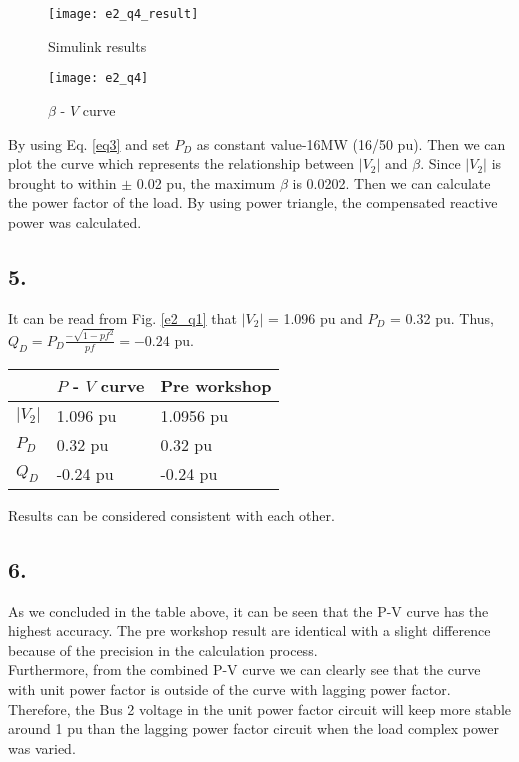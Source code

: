 \documentclass{article}
\begin{document}
\begin{figure}[H]
\centering
\texttt{[image: e2\_q4\_result]}
\caption{Simulink results}
\end{figure}

\begin{figure}[H]
\centering
\texttt{[image: e2\_q4]}
\caption{$\beta$ - $V$ curve}
\end{figure}

By using Eq. \ref{eq3} and set $P_D$ as constant value-16MW (16/50 pu). Then we can plot the curve which represents the relationship between $|V_2|$ and $\beta$. Since $|V_2|$ is brought to within $\pm$ 0.02 pu, the maximum $\beta$ is 0.0202. Then we can calculate the power factor of the load. By using power triangle, the compensated reactive power was calculated.

\subsection*{5.}
It can be read from Fig. \ref{e2_q1} that $|V_2|$ = 1.096 pu and $P_D$ = 0.32 pu. Thus, $Q_D = P_D \frac{-\sqrt{1 - pf^2}}{pf} = -0.24$ pu.

\begin{tabu} to \textwidth {XXX}
\toprule
&$P$ - $V$ curve &Pre workshop\\
\hline
$|V_2|$ &1.096 pu &1.0956 pu\\
\hline
$P_D$ &0.32 pu &0.32 pu\\
\hline
$Q_D$ &-0.24 pu &-0.24 pu\\
\bottomrule
\end{tabu}

\vspace{9pt}
Results can be considered consistent with each other.

\subsection*{6.}
As we concluded in the table above, it can be seen that the P-V curve has the highest accuracy. The pre workshop result are identical with a slight difference because of the precision in the calculation process.\\

Furthermore, from the combined P-V curve we can clearly see that the curve with unit power factor is outside of the curve with lagging power factor. Therefore, the Bus 2 voltage in the unit power factor circuit will keep more stable around 1 pu than the lagging power factor circuit when the load complex power was varied.
\end{document}
